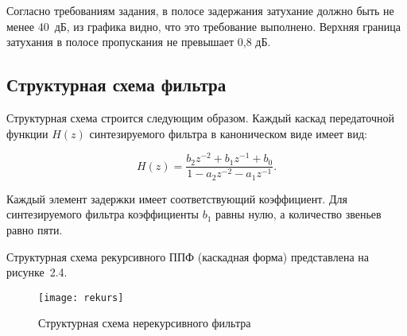 Согласно требованиям задания, в полосе задержания затухание должно
быть не менее 40~дБ, из графика видно, что это требование
выполнено. Верхняя граница затухания в полосе пропускания не превышает
0{,}8 дБ.

\subsection{Структурная схема фильтра}
\label{sec:scheme_nerekurs}

Структурная схема строится следующим образом. Каждый каскад
передаточной функции $H(z)$ синтезируемого фильтра в каноническом виде
имеет вид:

\begin{equation*}
  H(z) = \frac{b_2z^{-2}+b_1z^{-1}+b_0}{1-a_2z^{-2}-a_1z^{-1}}.
\end{equation*}

Каждый элемент задержки имеет соответствующий коэффициент. Для
синтезируемого фильтра коэффициенты $b_1$ равны нулю, а количество
звеньев равно пяти.

Структурная схема рекурсивного ППФ (каскадная форма) представлена на
рисунке~2.4.

\begin{figure}[p]
  \label{nerekurs_dia}
  \texttt{[image: rekurs]}
  \caption{Структурная схема нерекурсивного фильтра}
\end{figure}
\newpage



